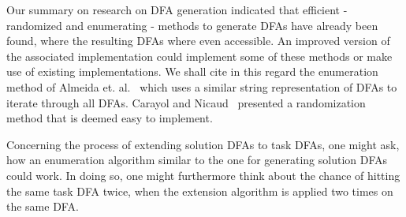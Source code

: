 Our summary on research on DFA generation indicated that efficient - randomized and enumerating - methods to generate DFAs have already been found, where the resulting DFAs where even accessible. An improved version of the associated implementation could implement some of these methods or make use of existing implementations. We shall cite in this regard the enumeration method of Almeida et. al.~\cite{AAA09} which uses a similar string representation of DFAs to iterate through all DFAs. Carayol and Nicaud~\cite{CN12} presented a randomization method that is deemed easy to implement.

Concerning the process of extending solution DFAs to task DFAs, one might ask, how an enumeration algorithm similar to the one for generating solution DFAs could work. In doing so, one might furthermore think about the chance of hitting the same task DFA twice, when the extension algorithm is applied two times on the same DFA.
